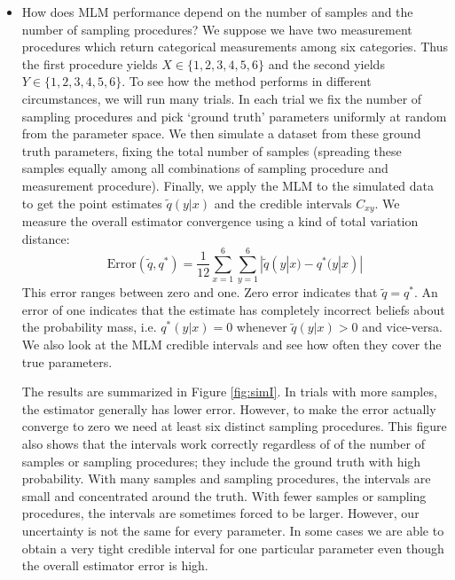 \begin{itemize}
    \item How does MLM performance depend on the number of samples and the number of sampling procedures?  We suppose we have two measurement procedures which return categorical measurements among six categories.  Thus the first procedure yields $X\in \{1,2,3,4,5,6\}$ and the second yields $Y\in \{1,2,3,4,5,6\}$.  To see how the method performs in different circumstances, we will run many trials.  In each trial we fix the number of sampling procedures and pick `ground truth' parameters uniformly at random from the parameter space.  We then simulate a dataset from these ground truth parameters, fixing the total number of samples (spreading these samples equally among all combinations of sampling procedure and measurement procedure).  Finally, we apply the MLM to the simulated data to get the point estimates $\tilde q(y|x)$ and the credible intervals $C_{x y}$.  We measure the overall estimator convergence using a kind of total variation distance:
    \[
    \mathrm{Error}(\tilde q,q^*)=\frac{1}{12}\sum_{x=1}^{6}\sum_{y=1}^{6} |\tilde q(y|x) - q^*(y|x)|
    \]
    This error ranges between zero and one.  Zero error indicates that $\tilde q=q^*$. An error of one indicates that the estimate has completely incorrect beliefs about the probability mass, i.e. $q^*(y|x)=0$ whenever $\tilde q(y|x)>0$ and vice-versa.  We also look at the MLM credible intervals and see how often they cover the true parameters.  

    The results are summarized in Figure \ref{fig:simI}.  In trials with more samples, the estimator generally has lower error.  However, to make the error actually converge to zero we need at least six distinct sampling procedures.  This figure also shows that the intervals work correctly regardless of of the number of samples or sampling procedures; they include the ground truth with high probability.   With many samples and sampling procedures, the intervals are small and concentrated around the truth.  With fewer samples or sampling procedures, the intervals are sometimes forced to be larger.  However, our uncertainty is not the same for every parameter.  In some cases we are able to obtain a very tight credible interval for one particular parameter even though the overall estimator error is high.  


\end{itemize}
